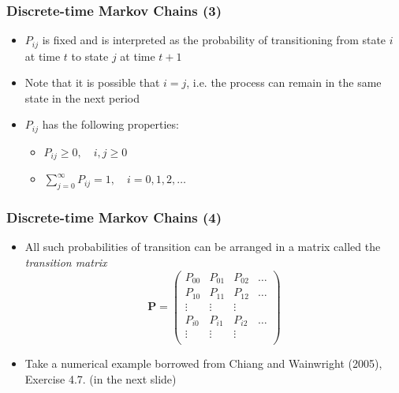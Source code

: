 \documentclass[10pt]{beamer}
\theoremstyle{definition}
\begin{document}
\begin{frame}[fragile]
	\frametitle{Discrete-time Markov Chains (3)}
	\begin{itemize}
		\item $ P_{ij} $ is fixed and is interpreted as the probability of transitioning from state $ i $ at time $ t $ to state $ j $ at time $ t+1 $
		
		\item Note that it is possible that $ i = j $, i.e. the process can remain in the same state in the next period
		
		\item $ P_{ij} $ has the following properties:
		\begin{itemize}
			\item $ P_{ij} \geq 0, \quad i,j \geq 0 $
			
			\item $ \displaystyle\sum_{j = 0}^{\infty} P_{ij} = 1,\quad i = 0, 1, 2, \ldots $
		\end{itemize}
	\end{itemize}
\end{frame}

\begin{frame}[fragile]
	\frametitle{Discrete-time Markov Chains (4)}
	\begin{itemize}
		\item All such probabilities of transition can be arranged in a matrix called the \textit{transition matrix}
		\[
			\mathbf{P} = 
			\begin{pmatrix}
				P_{00} & P_{01} & P_{02} & \ldots\\
				P_{10} & P_{11} & P_{12} & \ldots\\
				\vdots & \vdots & \vdots\\
				P_{i0} & P_{i1} & P_{i2} & \ldots\\
				\vdots & \vdots & \vdots\\
			\end{pmatrix}
		\]
		
		\item Take a numerical example borrowed from Chiang and Wainwright (2005), Exercise 4.7. (in the next slide)
	\end{itemize}
\end{frame}
\end{document}
